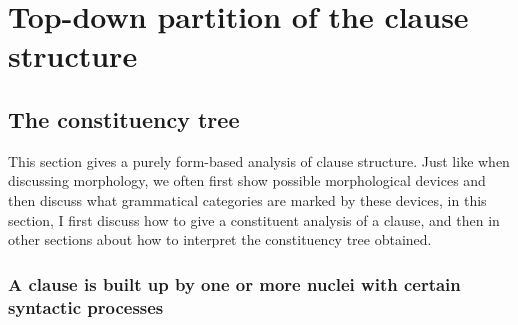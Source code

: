\documentclass{article}
\begin{document}
\section{Top-down partition of the clause structure}

\subsection{The constituency tree}

This section gives a purely form-based analysis of clause structure.
Just like when discussing morphology,
we often first show possible morphological devices 
and then discuss what grammatical categories are marked by these devices,
in this section, I first discuss how to give a constituent analysis of a clause,
and then in other sections about how to interpret the constituency tree obtained.

\subsubsection{A clause is built up by one or more nuclei with certain syntactic processes}
\end{document}
